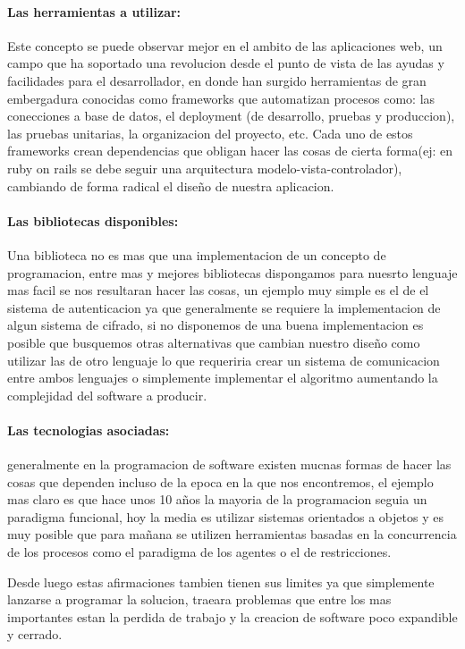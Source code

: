 \paragraph{Las herramientas a utilizar:}
Este concepto se puede observar mejor en el ambito de las aplicaciones web, un campo que ha soportado una revolucion desde el punto de vista de las ayudas y facilidades para el desarrollador, en donde han surgido herramientas de gran embergadura conocidas como frameworks que automatizan procesos como: las conecciones a base de datos, el deployment (de desarrollo, pruebas y produccion), las pruebas unitarias, la organizacion del proyecto, etc. Cada uno de estos frameworks crean dependencias que obligan hacer las cosas de cierta forma(ej: en ruby on rails se debe seguir una arquitectura modelo-vista-controlador), cambiando de forma radical el diseño de nuestra aplicacion.

\paragraph{Las bibliotecas disponibles:}
Una biblioteca no es mas que una implementacion de un concepto de programacion, entre mas y mejores bibliotecas dispongamos para nuesrto lenguaje mas facil se nos resultaran hacer las cosas, un ejemplo muy simple es el de el sistema de autenticacion ya que generalmente se requiere la implementacion de algun sistema de cifrado, si no disponemos de una buena implementacion es posible que busquemos otras alternativas que cambian nuestro diseño como utilizar las de otro lenguaje lo que requeriria crear un sistema de comunicacion entre ambos lenguajes o simplemente implementar el algoritmo aumentando la complejidad del software a producir.

\paragraph{Las tecnologias asociadas:}
generalmente en la programacion de software existen mucnas formas de hacer las cosas que dependen incluso de la epoca en la que nos encontremos, el ejemplo mas claro es que hace unos 10 años la mayoria de la programacion seguia un paradigma funcional, hoy la media es utilizar sistemas orientados a objetos y es muy posible que para mañana se utilizen herramientas basadas en la concurrencia de los procesos como el paradigma de los agentes o el de restricciones.


Desde luego estas afirmaciones tambien tienen sus limites ya que simplemente lanzarse a programar la solucion, traeara problemas que entre los mas importantes estan la perdida de trabajo y la creacion de software poco expandible y cerrado.

